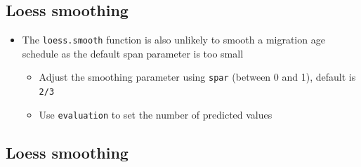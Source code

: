 \documentclass[
]{book}
\newenvironment{Shaded}{\begin{snugshade}}{\end{snugshade}}
\newcommand{\AttributeTok}[1]{\textcolor[rgb]{0.77,0.63,0.00}{#1}}
\newcommand{\FloatTok}[1]{\textcolor[rgb]{0.00,0.00,0.81}{#1}}
\newcommand{\FunctionTok}[1]{\textcolor[rgb]{0.00,0.00,0.00}{#1}}
\newcommand{\NormalTok}[1]{#1}
\newcommand{\OtherTok}[1]{\textcolor[rgb]{0.56,0.35,0.01}{#1}}
\newcommand{\SpecialCharTok}[1]{\textcolor[rgb]{0.00,0.00,0.00}{#1}}
\providecommand{\tightlist}{%
  \setlength{\itemsep}{0pt}\setlength{\parskip}{0pt}}
\begin{document}
\hypertarget{loess-smoothing}{%
\subsection{Loess smoothing}\label{loess-smoothing}}

\begin{itemize}
\tightlist
\item
  The \texttt{loess.smooth} function is also unlikely to smooth a migration age schedule as the default span parameter is too small

  \begin{itemize}
  \tightlist
  \item
    Adjust the smoothing parameter using \texttt{spar} (between 0 and 1), default is \texttt{2/3}
  \item
    Use \texttt{evaluation} to set the number of predicted values
  \end{itemize}
\end{itemize}

\begin{Shaded}
\end{Shaded}

\hypertarget{loess-smoothing-1}{%
\subsection{Loess smoothing}\label{loess-smoothing-1}}
\end{document}
